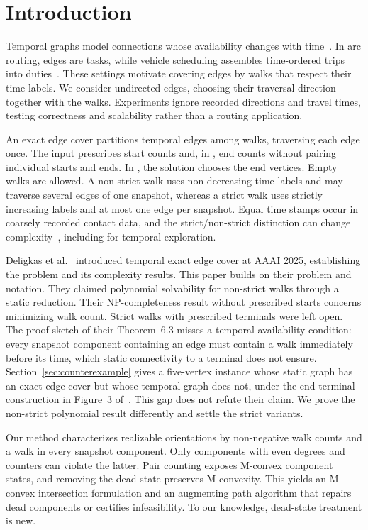 \section{Introduction}\label{sec:intro}

Temporal graphs model connections whose availability changes with time~\cite{holme2012,michail2016}. In arc routing, edges are tasks, while vehicle scheduling assembles time-ordered trips into duties~\cite{edmonds1973,corberan2015,bunte2009}. These settings motivate covering edges by walks that respect their time labels. We consider undirected edges, choosing their traversal direction together with the walks. Experiments ignore recorded directions and travel times, testing correctness and scalability rather than a routing application.

An exact edge cover partitions temporal edges among walks, traversing each edge once. The input prescribes start counts and, in \FIX{}, end counts without pairing individual starts and ends. In \FREE{}, the solution chooses the end vertices. Empty walks are allowed. A non-strict walk uses non-decreasing time labels and may traverse several edges of one snapshot, whereas a strict walk uses strictly increasing labels and at most one edge per snapshot. Equal time stamps occur in coarsely recorded contact data, and the strict/non-strict distinction can change complexity~\cite{casteigts2024,erlebach2023}, including for temporal exploration.

Deligkas et al.~\cite{deligkas2025} introduced temporal exact edge cover at AAAI 2025, establishing the problem and its complexity results. This paper builds on their problem and notation. They claimed polynomial solvability for non-strict walks through a static reduction. Their NP-completeness result without prescribed starts concerns minimizing walk count. Strict walks with prescribed terminals were left open. The proof sketch of their Theorem~6.3 misses a temporal availability condition: every snapshot component containing an edge must contain a walk immediately before its time, which static connectivity to a terminal does not ensure. Section~\ref{sec:counterexample} gives a five-vertex instance whose static graph has an exact edge cover but whose temporal graph does not, under the end-terminal construction in Figure~3 of~\cite{deligkas2025}. This gap does not refute their claim. We prove the non-strict polynomial result differently and settle the strict variants.

Our method characterizes realizable orientations by non-negative walk counts and a walk in every snapshot component. Only components with even degrees and counters can violate the latter. Pair counting exposes M-convex component states, and removing the dead state preserves M-convexity. This yields an M-convex intersection formulation and an augmenting path algorithm that repairs dead components or certifies infeasibility. To our knowledge, dead-state treatment is new. 

